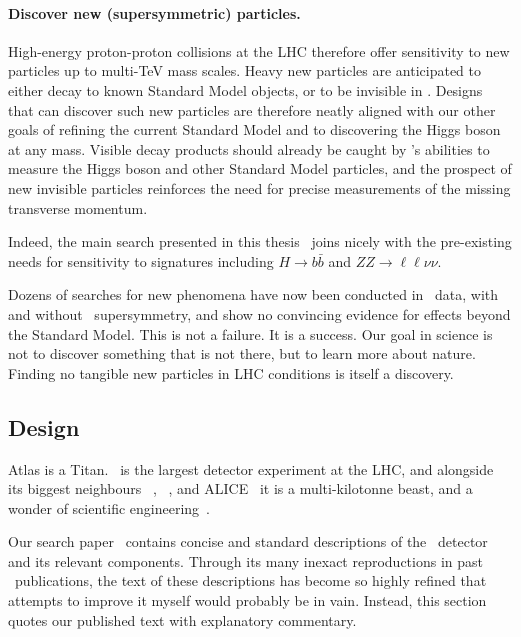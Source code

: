 \paragraph{Discover new (supersymmetric) particles.}
High-energy proton-proton collisions at the LHC therefore offer sensitivity
to new particles up to multi-TeV mass scales.
Heavy new particles are anticipated to either decay to known Standard Model
objects, or to be invisible in \atlas.
Designs that can discover such new particles are therefore neatly aligned with
our other goals of refining the current Standard Model
and to discovering the Higgs boson at any mass.
Visible decay products should already be caught by \atlas's abilities
to measure the Higgs boson and other Standard Model particles,
and the prospect of new invisible particles reinforces the need for precise
measurements of the missing transverse momentum.

Indeed, the main search presented in this thesis~\cite{atlas2022searches}
joins nicely with the pre-existing needs for sensitivity to signatures
including
$H \to b\bar b$
and
$ZZ \to \ell\ell\nu\nu$.

Dozens of searches for new phenomena have now been conducted in \atlas\ data,
with~\cite{
ATL-PHYS-PUB-2022-013
}
and without~\cite{
ATL-PHYS-PUB-2022-007,
ATL-PHYS-PUB-2022-012,
ATL-PHYS-PUB-2022-036,
ATL-PHYS-PUB-2022-034
} supersymmetry,
and show no convincing evidence for effects beyond the Standard Model.
This is not a failure. It is a success.
Our goal in science is not to discover something that is not there,
but to learn more about nature.
Finding no tangible new particles in LHC conditions is itself a discovery.


\subsection{Design}
Atlas is a Titan.
\atlas\ is the largest detector experiment at the LHC,
and alongside its biggest neighbours
\cms~\cite{cms2008experiment},
\lhcb~\cite{lhcb2008experiment},
and ALICE~\cite{alice2008experiment}
it is a multi-kilotonne beast,
and a wonder of scientific engineering~\cite{
atlas1994proposal,
atlas2008experiment,
atlas1999design1,
atlas1999design2
}.

Our search paper~\cite{atlas2022searches} contains concise and standard
descriptions of the \atlas\ detector and its relevant components.
Through its many inexact reproductions in past \atlas\ publications, the text
of these descriptions has become so highly refined that attempts to improve
it myself would probably be in vain.
Instead, this section quotes our published text with explanatory commentary.

